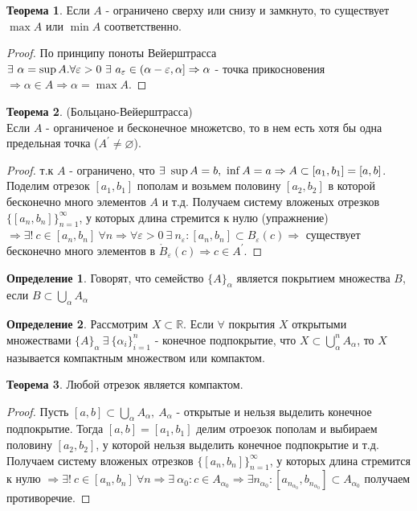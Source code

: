 \documentclass[a4paper, 12pt]{article}
\newcommand{\R}{\mathbb{R}}
\renewcommand{\epsilon}{\varepsilon}
\renewcommand{\emptyset}{\varnothing}
\theoremstyle{definition}
\newtheorem*{definition}{Определение}
\newtheorem*{theorem}{Теорема}
\begin{document}
        \begin{theorem}
            Если $A$ - ограничено сверху или снизу и замкнуто, то существует $\max{A}$ или $\min{A}$ соответственно.
        \end{theorem} 
        \begin{proof}
            По принципу поноты Вейерштрасса $\exists\ \alpha=\sup{A}.\\ \forall\epsilon>0\ \exists\ a_{\epsilon}\in (\alpha-\epsilon, \alpha]\Rightarrow \alpha$ - точка прикосновения $\Rightarrow \alpha \in A\Rightarrow \alpha=\max{A}$.
        \end{proof}
        \begin{theorem} (Больцано-Вейерштрасса)\\
            Если $A$ - органиченое и бесконечное множетсво, то в нем есть хотя бы одна предельная точка ($A^{\prime}\ne \emptyset$).
        \end{theorem} 
        \begin{proof}
            т.к $A$ - ограничено, что $\exists\ \sup{A}=b,\ \inf{A}=a\\ \Rightarrow A\subset [a_1,b_1] = [a,b]$. Поделим отрезок $[a_1,b_1]$ пополам и возьмем половину $[a_2,b_2]$ в которой бесконечно много элементов $A$ и т.д. Получаем систему вложеных отрезков $\{[a_n,b_n]\}_{n=1}^{\infty}$, у которых длина стремится к нулю (упражнение) $\Rightarrow \exists!\ c\in [a_n,b_n]\ \forall n\Rightarrow \forall \epsilon>0\ \exists\ n_{\epsilon}: [a_n,b_n]\subset B_{\epsilon}(c) \Rightarrow$ существует бесконечно много элементов в $\mathring{B}_{\epsilon}(c)\Rightarrow c\in A^{\prime}$.
        \end{proof}
        \begin{definition}
            Говорят, что семейство $\{A\}_{\alpha}$ является покрытием множества $B$, если $B\subset \bigcup\limits_{\alpha}A_{\alpha}$
        \end{definition} 
        \begin{definition}
            Рассмотрим $X\subset \R$. Если $\forall$ покрытия $X$ открытыми множествами $\{A\}_{\alpha}\ \exists\ \{\alpha_i\}_{i=1}^n$ - конечное подпокрытие, что $X\subset \bigcup\limits_{\alpha}^n A_{\alpha}$, то $X$ называется компактным множеством или компактом.
        \end{definition} 
        \begin{theorem}
            Любой отрезок является компактом.
        \end{theorem} 
        \begin{proof}
            Пусть $[a,b]\subset \bigcup\limits_{\alpha}A_{\alpha},\ A_{\alpha}$ - открытые и нельзя выделить конечное подпокрытие. Тогда $[a,b]=[a_1,b_1]$ делим отроезок пополам и выбираем половину $[a_2,b_2]$, у которой нельзя выделить конечное подпокрытие и т.д. Получаем систему вложеных отрезков $\{[a_n,b_n]\}_{n=1}^{\infty}$, у которых длина стремится к нулю $\Rightarrow \exists!\ c\in [a_n,b_n]\ \forall n \Rightarrow \exists\ \alpha_0: c\in A_{\alpha_0}\Rightarrow \exists n_{\alpha_0}: [a_{n_{\alpha_0}},b_{n_{\alpha_0}}]\subset A_{\alpha_0}$ получаем противоречие.
        \end{proof} 
\end{document}
